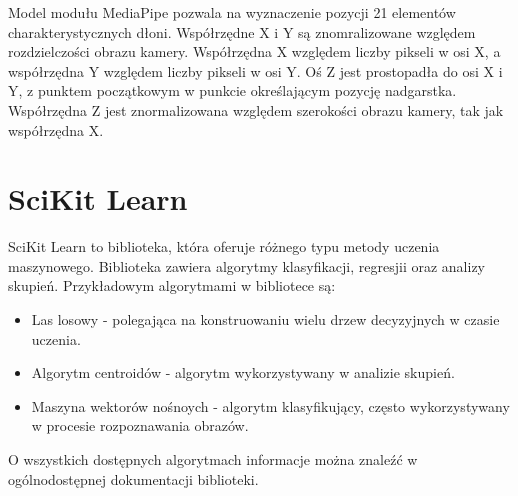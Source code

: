 \quad Model modułu MediaPipe pozwala na wyznaczenie pozycji 21 elementów charakterystycznych dłoni. Współrzędne X i Y są znomralizowane względem rozdzielczości obrazu kamery. Współrzędna X względem liczby pikseli w osi X, a współrzędna Y względem liczby pikseli w osi Y. Oś Z jest prostopadła do osi X i Y, z punktem początkowym w punkcie określającym pozycję nadgarstka. Współrzędna Z jest znormalizowana względem szerokości obrazu kamery, tak jak współrzędna X. 

\section{SciKit Learn}

\quad SciKit Learn to biblioteka, która oferuje różnego typu metody uczenia maszynowego. Biblioteka zawiera algorytmy klasyfikacji, regresjii oraz analizy skupień. Przykładowym algorytmami w bibliotece są:
\begin{itemize}
    \item Las losowy - polegająca na konstruowaniu wielu drzew decyzyjnych w czasie uczenia. 
    \item Algorytm centroidów - algorytm wykorzystywany w analizie skupień.
    \item Maszyna wektorów nośnoych - algorytm klasyfikujący, często wykorzystywany w procesie rozpoznawania obrazów. 
\end{itemize}
O wszystkich dostępnych algorytmach informacje można znaleźć w ogólnodostępnej dokumentacji biblioteki. 


